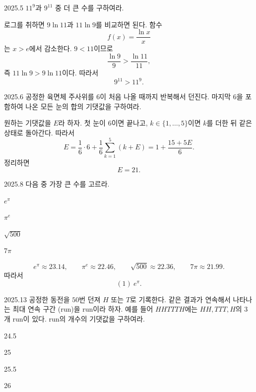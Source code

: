 \begin{pastproblem}{2025.5}
$11^9$과 $9^{11}$ 중 더 큰 수를 구하여라.
\end{pastproblem}

\begin{solution}
로그를 취하면 $9\ln11$과 $11\ln9$를 비교하면 된다. 함수
\[
f(x)=\frac{\ln x}{x}
\]
는 $x>e$에서 감소한다. $9<11$이므로
\[
\frac{\ln9}{9}>\frac{\ln11}{11},
\]
즉 $11\ln9>9\ln11$이다. 따라서
\[
\boxed{9^{11}>11^9}.
\]
\end{solution}

\begin{pastproblem}{2025.6}
공정한 육면체 주사위를 $6$이 처음 나올 때까지 반복해서 던진다. 마지막 $6$을 포함하여 나온 모든 눈의 합의 기댓값을 구하여라.
\end{pastproblem}

\begin{solution}
원하는 기댓값을 $E$라 하자. 첫 눈이 $6$이면 끝나고, $k\in\{1,\ldots,5\}$이면 $k$를 더한 뒤 같은 상태로 돌아간다. 따라서
\[
E=\frac16\cdot6+\frac16\sum_{k=1}^5(k+E)
=1+\frac{15+5E}{6}.
\]
정리하면
\[
\boxed{E=21}.
\]
\end{solution}

\begin{pastproblem}{2025.8}
다음 중 가장 큰 수를 고르라.
\begin{problemchoices}
\item $e^\pi$
\item $\pi^e$
\item $\sqrt{500}$
\item $7\pi$
\end{problemchoices}
\end{pastproblem}

\begin{solution}
\[
e^\pi\approx23.14,\qquad
\pi^e\approx22.46,\qquad
\sqrt{500}\approx22.36,\qquad
7\pi\approx21.99.
\]
따라서
\[
\boxed{(1)\ e^\pi}.
\]
\end{solution}

\begin{pastproblem}{2025.13}
공정한 동전을 $50$번 던져 $H$ 또는 $T$로 기록한다. 같은 결과가 연속해서 나타나는 최대 연속 구간 (run)을 run이라 하자. 예를 들어 $HHTTTH$에는 $HH,TTT,H$의 $3$개 run이 있다. run의 개수의 기댓값을 구하여라.
\begin{problemchoices}
\item 24.5
\item 25
\item 25.5
\item 26
\end{problemchoices}
\end{pastproblem}

